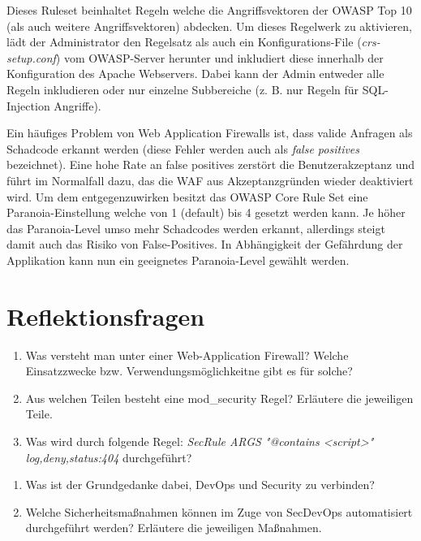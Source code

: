 Dieses Ruleset beinhaltet Regeln welche die Angriffsvektoren der OWASP Top 10 (als auch weitere Angriffsvektoren) abdecken. Um dieses Regelwerk zu aktivieren, lädt der Administrator den Regelsatz als auch ein Konfigurations-File (\textit{crs-setup.conf}) vom OWASP-Server herunter und inkludiert diese innerhalb der Konfiguration des Apache Webservers. Dabei kann der Admin entweder alle Regeln inkludieren oder nur einzelne Subbereiche (z. B. nur Regeln für SQL-Injection Angriffe).

Ein häufiges Problem von Web Application Firewalls ist, dass valide Anfragen als Schadcode erkannt werden (diese Fehler werden auch als \textit{false positives} bezeichnet). Eine hohe Rate an false positives zerstört die Benutzerakzeptanz und führt im Normalfall dazu, das die WAF aus Akzeptanzgründen wieder deaktiviert wird. Um dem entgegenzuwirken besitzt das OWASP Core Rule Set eine Paranoia-Einstellung welche von 1 (default) bis 4 gesetzt werden kann. Je höher das Paranoia-Level umso mehr Schadcodes werden erkannt, allerdings steigt damit auch das Risiko von False-Positives. In Abhängigkeit der Gefährdung der Applikation kann nun ein geeignetes Paranoia-Level gewählt werden.

\section{Reflektionsfragen}

\begin{enumerate}
	\item Was versteht man unter einer Web-Application Firewall? Welche Einsatzzwecke bzw. Verwendungsmöglichkeitne gibt es für solche?
	\item Aus welchen Teilen besteht eine mod\_security Regel? Erläutere die jeweiligen Teile.
	\item Was wird durch folgende Regel: \textit{SecRule ARGS "@contains <script>" log,deny,status:404} durchgeführt?
\end{enumerate}

\begin{enumerate}
	\item Was ist der Grundgedanke dabei, DevOps und Security zu verbinden?
	\item Welche Sicherheitsmaßnahmen können im Zuge von SecDevOps automatisiert durchgeführt werden? Erläutere die jeweiligen Maßnahmen.
\end{enumerate}
